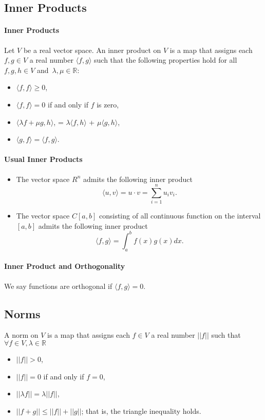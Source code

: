 \documentclass[12pt, letterpaper]{article}
\begin{document}
    \subsection{Inner Products}
    \paragraph{Inner Products}
    Let \(V\) be a real vector space. An inner product on \(V\) is a map
    that assigns each \(f,g\in V\) a real number \(\langle f, g \rangle\)
    such that the following properties hold for all \(f, g, h \in V\) and\
    \(\lambda, \mu \in \mathbb{R}\):
    \begin{itemize}
        \item \(\langle f, f \rangle \geq 0\),
        \item \(\langle f, f \rangle = 0\) if and only if \(f\) is zero,
        \item \(\langle \lambda f + \mu g, h\rangle\),
        = \(\lambda\langle f, h\rangle\) + \(\mu\langle g, h\rangle\),
        \item \(\langle g, f \rangle = \langle f, g \rangle\).
    \end{itemize}

    \paragraph{Usual Inner Products}
    \begin{itemize}
        \item The vector space \(R^n\) admits the following inner product
        \[ 
            \langle u, v \rangle = u\cdot v = \sum_{i=1}^n u_i v_i.
        \]
        \item The vector space \(C[a, b]\) consisting of all continuous
        function on the interval \([a, b]\) admits the following inner product
        \[
            \langle f, g \rangle = \int_{a}^{b} f(x) g(x) dx.
        \]
    \end{itemize}

    \paragraph{Inner Product and Orthogonality}
    We say functions are orthogonal if \(\langle f, g\rangle = 0\).
    
    \subsection{Norms}
    A norm on \(V\) is a map that assigns each \(f\in V\) a real number
    \(||f||\) such that \(\forall f \in V, \lambda \in \mathbb{R}\)
    \begin{itemize}
        \item \(||f|| > 0\),
        \item \(||f|| = 0\) if and only if \(f = 0\),
        \item \(||\lambda f|| = \lambda ||f||\),
        \item \(||f + g|| \leq ||f|| + ||g||\); that is, the triangle inequality holds.
    \end{itemize}
    
\end{document}

